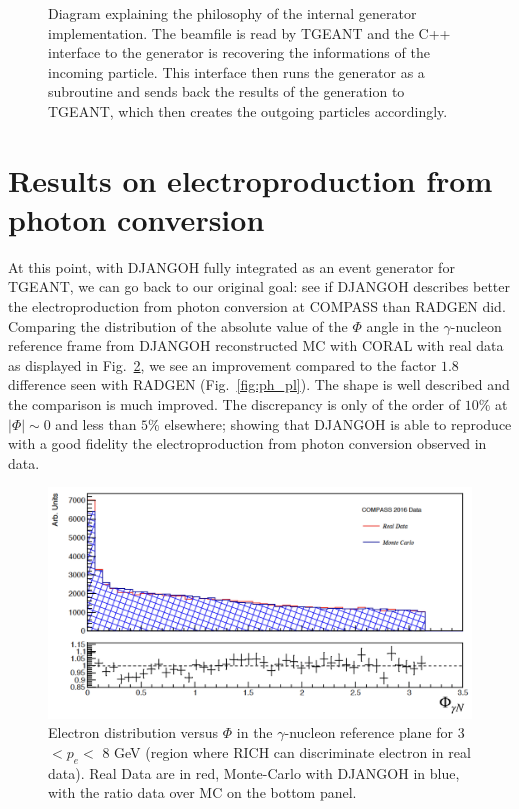 \begin{figure}[!htb]
\centerline{}
\caption{Diagram explaining the philosophy of the internal generator implementation.
The beamfile is read by TGEANT and the C++ interface to the generator is recovering the
informations of the incoming particle. This interface then runs the generator as a subroutine
and sends back the results of the generation to TGEANT, which then creates the outgoing particles
accordingly.}\label{fig:pythiaex}
\end{figure}


\section{Results on electroproduction from photon conversion}

At this point, with DJANGOH fully integrated as an event generator for TGEANT, we can go back to our original goal: see if DJANGOH describes better the electroproduction from photon conversion at COMPASS than RADGEN did. Comparing the distribution of the absolute value of the $\Phi$ angle in the $\gamma$-nucleon reference frame from DJANGOH reconstructed MC with CORAL with real data as displayed in Fig.~\ref{pic:Eprod2016}, we see an improvement compared to the factor $1.8$ difference seen with RADGEN (Fig.~\ref{fig:ph_pl}). The shape is well described and the comparison is much improved. The discrepancy is only of the order of $10$\% at $|\Phi| \sim 0$ and less than $5$\% elsewhere; showing that DJANGOH is able to reproduce with a good fidelity the electroproduction from photon conversion observed in data.

\begin{figure}[!h]
  \centering
	\includegraphics[scale=0.6]{./gfx/Eprod2016.png}
	\caption{Electron distribution versus $\Phi$ in the $\gamma$-nucleon reference plane for 3 $< p_e <$ 8 GeV (region where RICH can discriminate electron in real data). Real Data are in red, Monte-Carlo with DJANGOH in blue, with the ratio data over MC on the bottom panel.}
	\label{pic:Eprod2016}
\end{figure}

